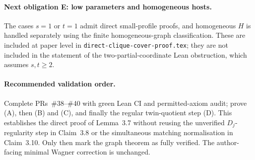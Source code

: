 \documentclass[11pt,a4paper]{article}
\begin{document}
\paragraph{Next obligation E: low parameters and homogeneous hosts.}
The cases \(s=1\) or \(t=1\) admit direct small-profile
proofs, and homogeneous \(H\) is handled separately
using the finite homogeneous-graph classification.
These are included at paper level in
\texttt{direct-clique-cover-proof.tex}; they are not
included in the statement of the two-partial-coordinate
Lean obstruction, which assumes \(s,t\ge2\).

\paragraph{Recommended validation order.}
Complete PRs~\#38--\#40 with green Lean CI and
permitted-axiom audit; prove (A), then (B) and (C),
and finally the regular twin-quotient step (D).
This establishes the direct proof of Lemma~3.7
without reusing the unverified \(D_j\)-regularity
step in Claim~3.8 or the simultaneous matching
normalisation in Claim~3.10.
Only then mark the graph theorem as fully verified.
The author-facing minimal Wagner correction is unchanged.
\end{document}

